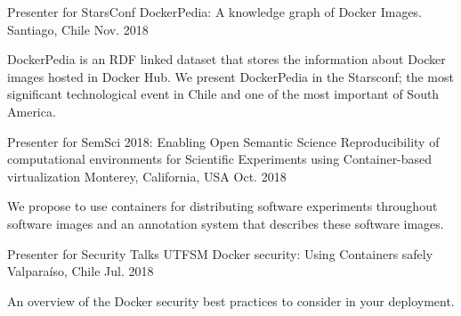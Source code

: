 \begin{cventries}
  \cventry
    {Presenter for StarsConf}
    {DockerPedia: A knowledge graph of Docker Images.}
    {Santiago, Chile}
    {Nov. 2018}
    {
      \begin{cvitems}
        \item {DockerPedia is an RDF linked dataset that stores the information about Docker images hosted in Docker Hub. We present DockerPedia in the Starsconf; the most significant technological event in Chile and one of the most important of South America.}
      \end{cvitems}
    }

 \cventry
    {Presenter for SemSci 2018: Enabling Open Semantic Science}
    {Reproducibility of computational environments for Scientific Experiments using Container-based virtualization}
    {Monterey, California, USA}
    {Oct. 2018}
    {
      \begin{cvitems}
        \item {We propose to use containers for  distributing  software  experiments throughout software images and an annotation system that describes these software images.}
        \end{cvitems}
    }    



    
  \cventry
    {Presenter for Security Talks UTFSM}
    {Docker security: Using Containers safely}
    {Valparaíso, Chile}
    {Jul. 2018}
    {
      \begin{cvitems}
        \item {An overview of the Docker security best practices to consider in your deployment.}
      \end{cvitems}
    }    
\end{cventries}
